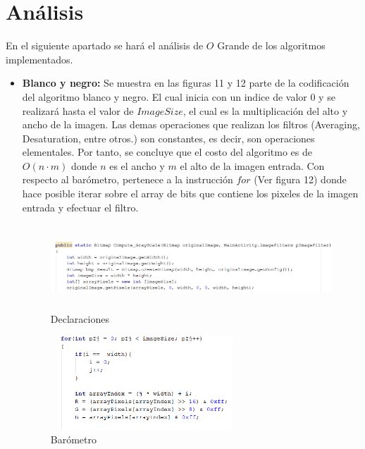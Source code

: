 \documentclass[journal]{IEEEtran}
\begin{document}
\newpage
\section{Análisis}
En el siguiente apartado se hará el análisis de $O$ Grande de los algoritmos implementados.

	\begin{itemize}
		\item{\bf Blanco y negro:} Se muestra en las figuras 11 y 12 parte de la codificación del algoritmo blanco y negro. El cual inicia con un indice de valor 0 y se realizará hasta el valor de $ImageSize$, el cual es la multiplicación del alto y ancho de la imagen. Las demas operaciones que realizan los filtros (Averaging, Desaturation, entre otros.) son constantes, es decir, son operaciones elementales. Por tanto, se concluye que el costo del algoritmo es de $O(n \cdot m)$ donde $n$ es el ancho y $m$ el alto de la imagen entrada. Con respecto al barómetro, pertenece a la instrucción $for$ (Ver figura 12) donde hace posible iterar sobre el array de bits que contiene los pixeles de la imagen entrada y efectuar el filtro.
		
		
		
		\begin{figure}[h]
			\centering
			\includegraphics[height= 90pt, width=300pt]{bn1.png}
			\caption{Declaraciones}
		\end{figure}
	
	
	
		\begin{figure}[h]
			\centering
			\includegraphics[height= 100pt, width=200pt]{bn2.png}
			\caption{Barómetro}
		\end{figure}
		
						
	\end{itemize}	
\end{document}
